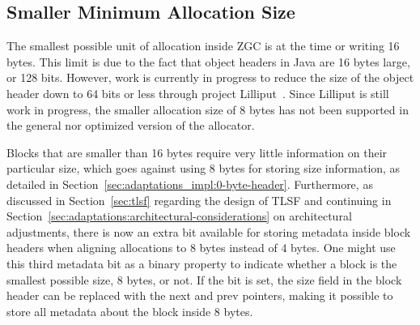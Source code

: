 
\subsection{Smaller Minimum Allocation Size}
\label{sec:future-work:lilliput}

The smallest possible unit of allocation inside ZGC is at the time or writing 16 bytes. This limit is due to the fact that object headers in Java are 16 bytes large, or 128 bits. However, work is currently in progress to reduce the size of the object header down to 64 bits or less through project Lilliput~\cite{lilliput}. Since Lilliput is still work in progress, the smaller allocation size of 8 bytes has not been supported in the general nor optimized version of the allocator.


Blocks that are smaller than 16 bytes require very little information on their particular size, which goes against using 8 bytes for storing size information, as detailed in Section~\ref{sec:adaptations_impl:0-byte-header}. Furthermore, as discussed in Section~\ref{sec:tlsf} regarding the design of TLSF and continuing in Section~\ref{sec:adaptations:architectural-considerations} on architectural adjustments, there is now an extra bit available for storing metadata inside block headers when aligning allocations to 8 bytes instead of 4 bytes. One might use this third metadata bit as a binary property to indicate whether a block is the smallest possible size, 8 bytes, or not. If the bit is set, the size field in the block header can be replaced with the next and prev pointers, making it possible to store all metadata about the block inside 8 bytes.


